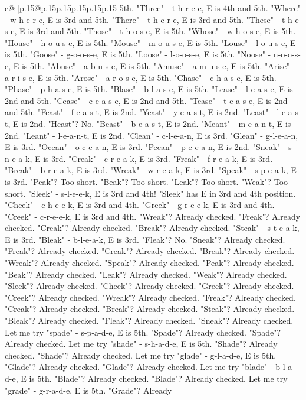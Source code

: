 \documentclass{article}
\begin{document}
{\begin{supertabular}{c@{$\;$}|p{.15\linewidth}@{}p{.15\linewidth}p{.15\linewidth}p{.15\linewidth}p{.15\linewidth}p{.15\linewidth}}
{{{5th. "Three" {-} t{-}h{-}r{-}e{-}e, E is 4th and 5th. "Where" {-} w{-}h{-}e{-}r{-}e, E is 3rd and 5th. "There" {-} t{-}h{-}e{-}r{-}e, E is 3rd and 5th. "These" {-} t{-}h{-}e{-}s{-}e, E is 3rd and 5th. "Those" {-} t{-}h{-}o{-}s{-}e, E is 5th. "Whose" {-} w{-}h{-}o{-}s{-}e, E is 5th. "House" {-} h{-}o{-}u{-}s{-}e, E is 5th. "Mouse" {-} m{-}o{-}u{-}s{-}e, E is 5th. "Louse" {-} l{-}o{-}u{-}s{-}e, E is 5th. "Goose" {-} g{-}o{-}o{-}s{-}e, E is 5th. "Loose" {-} l{-}o{-}o{-}s{-}e, E is 5th. "Noose" {-} n{-}o{-}o{-}s{-}e, E is 5th. "Abuse" {-} a{-}b{-}u{-}s{-}e, E is 5th. "Amuse" {-} a{-}m{-}u{-}s{-}e, E is 5th. "Arise" {-} a{-}r{-}i{-}s{-}e, E is 5th. "Arose" {-} a{-}r{-}o{-}s{-}e, E is 5th. "Chase" {-} c{-}h{-}a{-}s{-}e, E is 5th. "Phase" {-} p{-}h{-}a{-}s{-}e, E is 5th. "Blase" {-} b{-}l{-}a{-}s{-}e, E is 5th. "Lease" {-} l{-}e{-}a{-}s{-}e, E is 2nd and 5th. "Cease" {-} c{-}e{-}a{-}s{-}e, E is 2nd and 5th. "Tease" {-} t{-}e{-}a{-}s{-}e, E is 2nd and 5th. "Feast" {-} f{-}e{-}a{-}s{-}t, E is 2nd. "Yeast" {-} y{-}e{-}a{-}s{-}t, E is 2nd. "Least" {-} l{-}e{-}a{-}s{-}t, E is 2nd. "Heast"? No. "Beast" {-} b{-}e{-}a{-}s{-}t, E is 2nd. "Meant" {-} m{-}e{-}a{-}n{-}t, E is 2nd. "Leant" {-} l{-}e{-}a{-}n{-}t, E is 2nd. "Clean" {-} c{-}l{-}e{-}a{-}n, E is 3rd. "Glean" {-} g{-}l{-}e{-}a{-}n, E is 3rd. "Ocean" {-} o{-}c{-}e{-}a{-}n, E is 3rd. "Pecan" {-} p{-}e{-}c{-}a{-}n, E is 2nd. "Sneak" {-} s{-}n{-}e{-}a{-}k, E is 3rd. "Creak" {-} c{-}r{-}e{-}a{-}k, E is 3rd. "Freak" {-} f{-}r{-}e{-}a{-}k, E is 3rd. "Break" {-} b{-}r{-}e{-}a{-}k, E is 3rd. "Wreak" {-} w{-}r{-}e{-}a{-}k, E is 3rd. "Speak" {-} s{-}p{-}e{-}a{-}k, E is 3rd. "Peak"? Too short. "Beak"? Too short. "Leak"? Too short. "Weak"? Too short. "Sleek" {-} s{-}l{-}e{-}e{-}k, E is 3rd and 4th! "Sleek" has E in 3rd and 4th position. "Cheek" {-} c{-}h{-}e{-}e{-}k, E is 3rd and 4th. "Greek" {-} g{-}r{-}e{-}e{-}k, E is 3rd and 4th. "Creek" {-} c{-}r{-}e{-}e{-}k, E is 3rd and 4th. "Wreak"? Already checked. "Freak"? Already checked. "Creak"? Already checked. "Break"? Already checked. "Steak" {-} s{-}t{-}e{-}a{-}k, E is 3rd. "Bleak" {-} b{-}l{-}e{-}a{-}k, E is 3rd. "Fleak"? No. "Sneak"? Already checked. "Freak"? Already checked. "Creak"? Already checked. "Break"? Already checked. "Wreak"? Already checked. "Speak"? Already checked. "Peak"? Already checked. "Beak"? Already checked. "Leak"? Already checked. "Weak"? Already checked. "Sleek"? Already checked. "Cheek"? Already checked. "Greek"? Already checked. "Creek"? Already checked. "Wreak"? Already checked. "Freak"? Already checked. "Creak"? Already checked. "Break"? Already checked. "Steak"? Already checked. "Bleak"? Already checked. "Fleak"? Already checked. "Sneak"? Already checked. Let me try "spade" {-} s{-}p{-}a{-}d{-}e, E is 5th. "Spade"? Already checked. "Spade"? Already checked. Let me try "shade" {-} s{-}h{-}a{-}d{-}e, E is 5th. "Shade"? Already checked. "Shade"? Already checked. Let me try "glade" {-} g{-}l{-}a{-}d{-}e, E is 5th. "Glade"? Already checked. "Glade"? Already checked. Let me try "blade" {-} b{-}l{-}a{-}d{-}e, E is 5th. "Blade"? Already checked. "Blade"? Already checked. Let me try "grade" {-} g{-}r{-}a{-}d{-}e, E is 5th. "Grade"? Already }}}
\end{supertabular}}
\end{document}
